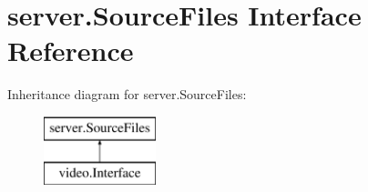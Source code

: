 \hypertarget{interfaceserver_1_1_source_files}{
\section{server.SourceFiles Interface Reference}
\label{interfaceserver_1_1_source_files}
}
Inheritance diagram for server.SourceFiles:\begin{figure}[H]
\begin{center}
\leavevmode
\includegraphics[height=2.000000cm]{interfaceserver_1_1_source_files}
\end{center}
\end{figure}

